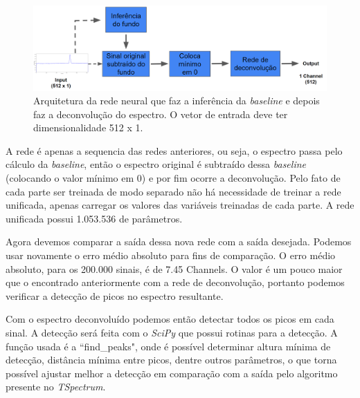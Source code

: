 \documentclass[a4paper,12pt,oneside]{book}
\begin{document}
\begin{figure}[H]
    \centering
    \includegraphics[scale = 0.28]{figs/source_to_deconv.png}
    \caption{Arquitetura da rede neural que faz a inferência da \textit{baseline} e depois faz a deconvolução do espectro. O vetor de entrada deve ter dimensionalidade 512 x 1.}
    \label{fig:arq:source_to_deconv}
\end{figure}

\par A rede é apenas a sequencia das redes anteriores, ou seja, o espectro passa pelo cálculo da \textit{baseline}, então o espectro original é subtraído dessa \textit{baseline} (colocando o valor mínimo em 0) e por fim ocorre a deconvolução. Pelo fato de cada parte ser treinada de modo separado não há necessidade de treinar a rede unificada, apenas carregar os valores das variáveis treinadas de cada parte. A rede unificada possui 1.053.536 de parâmetros.

\par Agora devemos comparar a saída dessa nova rede com a saída desejada. Podemos usar novamente o erro médio absoluto para fins de comparação. O erro médio absoluto, para os 200.000 sinais, é de 7.45 Channels. O valor é um pouco maior que o encontrado anteriormente com a rede de deconvolução, portanto podemos verificar a detecção de picos no espectro resultante.

\par Com o espectro deconvoluído podemos então detectar todos os picos em cada sinal. A detecção será feita com o \textit{SciPy} que possui rotinas para a detecção. A função usada é a ``find\_peaks", onde é possível determinar altura mínima de detecção, distância mínima entre picos, dentre outros parâmetros, o que torna possível ajustar melhor a detecção em comparação com a saída pelo algoritmo presente no \textit{TSpectrum}.

\end{document}
